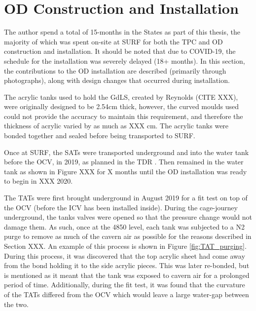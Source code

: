 \section{OD Construction and Installation} \label{od_construction_sec}

\par
The author spend a total of 15-months in the States as part of this thesis, the majority of which was spent on-site at SURF for both the TPC and OD construction and installation.
It should be noted that due to COVID-19, the schedule for the installation was severely delayed (18+ months).
In this section, the contributions to the OD installation are described (primarily through photographs), along with design changes that occurred during installation.

\par
The acrylic tanks used to hold the GdLS, created by Reynolds (CITE XXX), were originally designed to be 2.54cm thick, however, the curved moulds used could not provide the accuracy to maintain this requirement, and therefore the thickness of acrylic varied by as much as XXX cm.
The acrylic tanks were bonded together and sealed before being transported to SURF.

\par
Once at SURF, the SATs were transported underground and into the water tank before the OCV, in 2019, as planned in the TDR \cite{LZ_TechnicalDesignReview_ref}.
Then remained in the water tank as shown in Figure XXX for X months until the OD installation was ready to begin in XXX 2020. 


\par
The TATs were first brought underground in August 2019 for a fit test on top of the OCV (before the ICV has been installed inside).
During the cage-journey underground, the tanks valves were opened so that the pressure change would not damage them.
As such, once at the 4850 level, each tank was subjected to a N2 purge to remove as much of the cavern air as possible for the reasons described in Section XXX.
An example of this process is shown in Figure \ref{fig:TAT_purging}.
During this process, it was discovered that the top acrylic sheet had come away from the bond holding it to the side acrylic pieces.
This was later re-bonded, but is mentioned as it meant that the tank was exposed to cavern air for a prolonged period of time.
Additionally, during the fit test, it was found that the curvature of the TATs differed from the OCV which would leave a large water-gap between the two.


